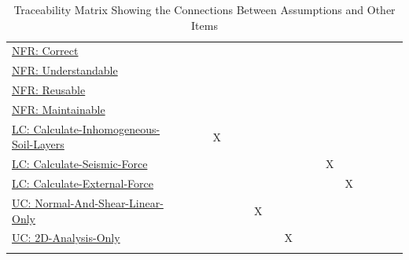 \documentclass[12pt]{article}
\begin{document}
\begin{longtable}{l l l l l l l l l l l l l l l l l}
\\
\hyperref[correct]{NFR: Correct} &  &  &  &  &  &  &  &  &  &  &  &  &  &  &  & 
\\
\hyperref[understandable]{NFR: Understandable} &  &  &  &  &  &  &  &  &  &  &  &  &  &  &  & 
\\
\hyperref[reusable]{NFR: Reusable} &  &  &  &  &  &  &  &  &  &  &  &  &  &  &  & 
\\
\hyperref[maintainable]{NFR: Maintainable} &  &  &  &  &  &  &  &  &  &  &  &  &  &  &  & 
\\
\hyperref[LC_inhomogeneous]{LC: Calculate-Inhomogeneous-Soil-Layers} &  &  & X &  &  &  &  &  &  &  &  &  &  &  &  & 
\\
\hyperref[LC_seismic]{LC: Calculate-Seismic-Force} &  &  &  &  &  &  &  &  &  &  & X &  &  &  &  & 
\\
\hyperref[LC_external]{LC: Calculate-External-Force} &  &  &  &  &  &  &  &  &  &  &  & X &  &  &  & 
\\
\hyperref[UC_normshearlinear]{UC: Normal-And-Shear-Linear-Only} &  &  &  &  &  & X &  &  &  &  &  &  &  &  &  & 
\\
\hyperref[UC_2donly]{UC: 2D-Analysis-Only} &  &  &  &  &  &  &  & X &  &  &  &  &  &  &  & 
\\
\bottomrule
\caption{Traceability Matrix Showing the Connections Between Assumptions and Other Items}
\label{Table:TraceMatAvsAll}
\end{longtable}
\end{document}

